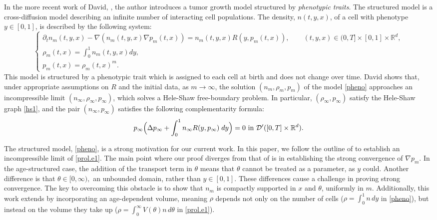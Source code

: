 \documentclass{amsart}
\def\R{\mathbb R}
\begin{document}
In the more recent work of David, \cite{david}, the author introduces a tumor growth model structured by \textit{phenotypic traits}. The structured model is a cross-diffusion model describing an infinite number of  interacting cell populations. The density, $n(t,y,x)$, of a cell with phenotype $y \in [0,1]$, is described by the following system:
\begin{equation}\label{pheno}
\begin{cases}
    \partial_t n_m(t,y,x) -\nabla (n_m(t,y,x) \nabla p_m(t,x))=n_m(t,y,x)R(y,p_m(t,x)), \qquad (t,y,x)\in (0,T]\times[0,1]\times\R^d, \\
    \rho_m(t,x)=\int_{0}^{1}n_m(t,y,x)dy, \\
    p_m(t,x)=\rho_m(t,x)^m.
    \end{cases}
\end{equation}
This model is structured by a phenotypic trait which is assigned to each cell at birth and does not change over time. David shows that, under appropriate assumptions on $R$ and the initial data, as $m \rightarrow \infty$, the solution $(n_m,\rho_m,p_m)$ of the model \eqref{pheno} approaches an incompressible limit $(n_\infty,\rho_\infty,p_\infty)$, which solves a Hele-Shaw free-boundary problem. In particular, $(\rho_\infty,p_\infty)$ satisfy the Hele-Shaw graph \eqref{hs1}, and the pair $(n_\infty,p_\infty)$ satisfies the following complementarity formula:
\begin{equation*}
    p_\infty\Bigl(\Delta p_\infty +\int_{0}^{1}n_\infty R(y,p_\infty)\;dy \Bigr)=0 \text{ in }\mathcal{D}'([0,T]\times \R^d).
\end{equation*}

The structured model, \eqref{pheno}, is a strong motivation for our current work. In this paper, we follow the outline of \cite{david} to establish an incompressible limit of \eqref{prol.e1}. The main point where our proof diverges from that of \cite{david} is in establishing the strong convergence of $\nabla p_m$. In the age-structured case, the addition of the transport term in $\theta$ means that $\theta$ cannot be treated as a parameter, as $y$ could. Another difference is that $\theta \in [0,\infty),$ an unbounded domain, rather than $y \in [0,1].$ These differences cause a challenge in proving strong convergence. The key to overcoming this obstacle is to show that $n_m$ is  compactly supported in $x$ and $\theta$, uniformly in $m$. Additionally, this work extends \cite{david} by incorporating an age-dependent volume, meaning $\rho$ depends not only on the number of cells ($\rho=\int_{0}^{1}n\,dy$ in \eqref{pheno}), but instead on the volume they take up ($\rho=\int_{0}^{\infty}V(\theta)n\,d\theta$ in \eqref{prol.e1}).
\end{document}
